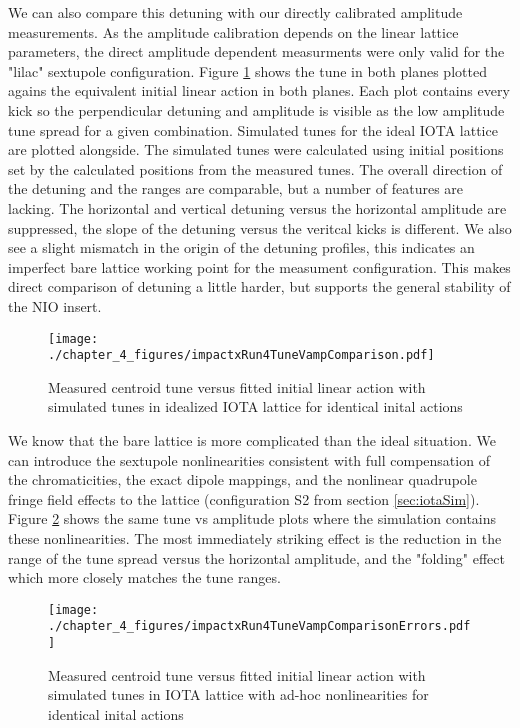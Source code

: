 We can also compare this detuning with our directly calibrated amplitude measurements. As the amplitude calibration depends on the linear lattice parameters, the direct amplitude dependent measurments were only valid for the "lilac" sextupole configuration. Figure \ref{fig:t238ampDetuneBase} shows the tune in both planes plotted agains the equivalent initial linear action in both planes. Each plot contains every kick so the perpendicular detuning and amplitude is visible as the low amplitude tune spread for a given combination. Simulated tunes for the ideal IOTA lattice are plotted alongside. The simulated tunes were calculated using initial positions set by the calculated positions from the measured tunes. The overall direction of the detuning and the ranges are comparable, but a number of features are lacking. The horizontal and vertical detuning versus the horizontal amplitude are suppressed, the slope of the detuning versus the veritcal kicks is different. We also see a slight mismatch in the origin of the detuning profiles, this indicates an imperfect bare lattice working point for the measument configuration. This makes direct comparison of detuning a little harder, but supports the general stability of the NIO insert.

\begin{figure}
	\centering
	\texttt{[image: ./chapter\_4\_figures/impactxRun4TuneVampComparison.pdf]}
	\caption{Measured centroid tune versus fitted initial linear action with simulated tunes in idealized IOTA lattice for identical inital actions}
	\label{fig:t238ampDetuneBase}
\end{figure}


We know that the bare lattice is more complicated than the ideal situation. We can introduce the sextupole nonlinearities consistent with full compensation of the chromaticities, the exact dipole mappings, and the nonlinear quadrupole fringe field effects to the lattice (configuration S2 from section \ref{sec:iotaSim}). Figure \ref{fig:t238ampDetuneError} shows the same tune vs amplitude plots where the simulation contains these nonlinearities. The most immediately striking effect is the reduction in the range of the tune spread versus the horizontal amplitude, and the "folding" effect which more closely matches the tune ranges.

\begin{figure}
	\centering
	\texttt{[image: ./chapter\_4\_figures/impactxRun4TuneVampComparisonErrors.pdf]}
	\caption{Measured centroid tune versus fitted initial linear action with simulated tunes in IOTA lattice with ad-hoc nonlinearities for identical inital actions}
	\label{fig:t238ampDetuneError}
\end{figure}

